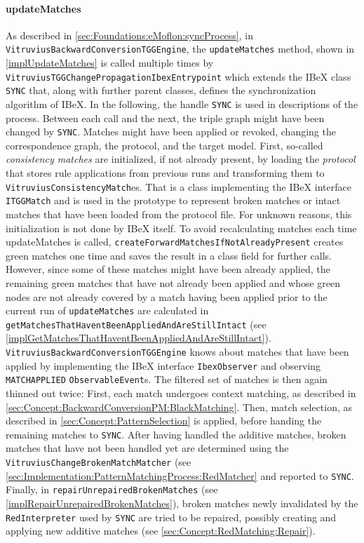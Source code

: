 \paragraph{updateMatches}
As described in \autoref{sec:Foundations:eMoflon:syncProcess}, in \newline\texttt{VitruviusBackwardConversionTGGEngine}, the \texttt{updateMatches} method, shown in \autoref{implUpdateMatches} is called multiple times by \texttt{VitruviusTGGChangePropagationIbexEntrypoint} which extends the IBeX class \texttt{SYNC} that, along with further parent classes, defines the synchronization algorithm of IBeX. In the following, the handle \texttt{SYNC} is used in descriptions of the process.
Between each call and the next, the triple graph might have been changed by \texttt{SYNC}. Matches might have been applied or revoked, changing the correspondence graph, the protocol, and the target model.
First, so-called \emph{consistency matches} are initialized, if not already present, by loading the \emph{protocol} that stores rule applications from previous runs and transforming them to \texttt{VitruviusConsistencyMatch}es. That is a class implementing the IBeX interface \texttt{ITGGMatch} and is used in the prototype to represent broken matches or intact matches that have been loaded from the protocol file.
For unknown reasons, this initialization is not done by IBeX itself.
To avoid recalculating matches each time updateMatches is called, \texttt{createForwardMatchesIfNotAlreadyPresent} creates green matches one time and saves the result in a class field for further calls.
However, since some of these matches might have been already applied, the remaining green matches that have not already been applied and whose green nodes are not already covered by a match having been applied prior to the current run of \texttt{updateMatches} are calculated in \texttt{getMatchesThatHaventBeenAppliedAndAreStillIntact} (see \autoref{implGetMatchesThatHaventBeenAppliedAndAreStillIntact}).
\texttt{VitruviusBackwardConversionTGGEngine} knows about matches that have been applied by implementing the IBeX interface \texttt{IbexObserver} and observing \texttt{MATCHAPPLIED} \texttt{ObservableEvent}s.
The filtered set of matches is then again thinned out twice: First, each match undergoes context matching, as described in \autoref{sec:Concept:BackwardConversionPM:BlackMatching}. Then, match selection, as described in \autoref{sec:Concept:PatternSelection} is applied, before handing the remaining matches to \texttt{SYNC}.
After having handled the additive matches, broken matches that have not been handled yet are determined using the \texttt{VitruviusChangeBrokenMatchMatcher} (see \autoref{sec:Implementation:PatternMatchingProcess:RedMatcher} and reported to \texttt{SYNC}.
Finally, in \texttt{repairUnrepairedBrokenMatches} (see \autoref{implRepairUnrepairedBrokenMatches}), broken matches newly invalidated by the \texttt{RedInterpreter} used by \texttt{SYNC} are tried to be repaired, possibly creating and applying new additive matches (see \autoref{sec:Concept:RedMatching:Repair}).


